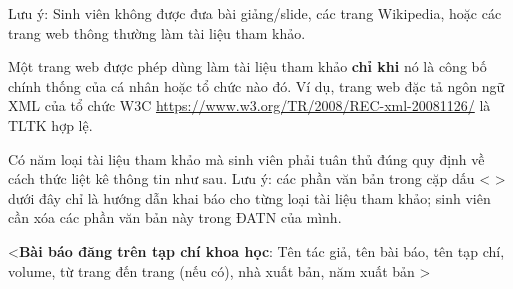 \documentclass[../main.tex]{subfiles}
\begin{document}
Lưu ý: Sinh viên không được đưa bài giảng/slide, các trang Wikipedia, hoặc các trang web thông thường làm tài liệu tham khảo. 

Một trang web được phép dùng làm tài liệu tham khảo \textbf{chỉ khi} nó là công bố chính thống của cá nhân hoặc tổ chức nào đó. Ví dụ, trang web đặc tả ngôn ngữ XML của tổ chức W3C \url{https://www.w3.org/TR/2008/REC-xml-20081126/} là TLTK hợp lệ.

Có năm loại tài liệu tham khảo mà sinh viên phải tuân thủ đúng quy định về cách thức liệt kê thông tin như sau. Lưu ý: các phần văn bản trong cặp dấu < > dưới đây chỉ là hướng dẫn khai báo cho từng loại tài liệu tham khảo; sinh viên cần xóa các phần văn bản này trong ĐATN của mình.

<\textbf{Bài báo đăng trên tạp chí khoa học}: Tên tác giả, tên bài báo, tên tạp chí, volume, từ trang đến trang (nếu có), nhà xuất bản, năm xuất bản >
\end{document}
